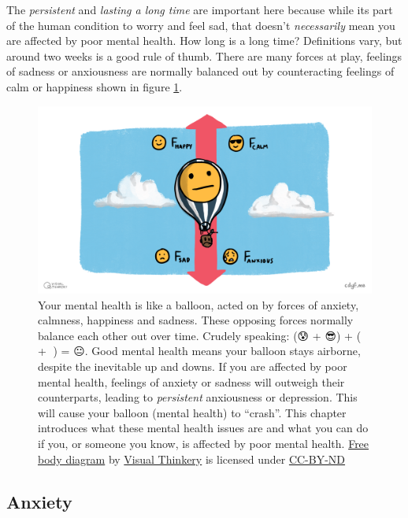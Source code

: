 \documentclass[
]{book}
\begin{document}
The \emph{persistent} and \emph{lasting a long time} are important here because while its part of the human condition to worry and feel sad, that doesn't \emph{necessarily} mean you are affected by poor mental health. How long is a long time? Definitions vary, but around two weeks is a good rule of thumb. There are many forces at play, feelings of sadness or anxiousness are normally balanced out by counteracting feelings of calm or happiness shown in figure \ref{fig:free-body-fig}.

\begin{figure}

{\centering \includegraphics[width=0.99\linewidth]{images/Free body diagram} 

}

\caption{Your mental health is like a balloon, acted on by forces of anxiety, calmness, happiness and sadness. These opposing forces normally balance each other out over time. Crudely speaking: (😰 + 😎) + (🙂 + 🙁) = 😐. Good mental health means your balloon stays airborne, despite the inevitable up and downs. If you are affected by poor mental health, feelings of anxiety or sadness will outweigh their counterparts, leading to \emph{persistent} anxiousness or depression. This will cause your balloon (mental health) to ``crash''. This chapter introduces what these mental health issues are and what you can do if you, or someone you know, is affected by poor mental health. \href{https://en.wikipedia.org/wiki/Free_body_diagram}{Free body diagram} by \href{https://visualthinkery.com}{Visual Thinkery} is licensed under \href{https://creativecommons.org/licenses/by-nd/4.0/}{CC-BY-ND} 🎈}\label{fig:free-body-fig}
\end{figure}



\hypertarget{anxiety}{%
\subsection{Anxiety}\label{anxiety}}
\end{document}
